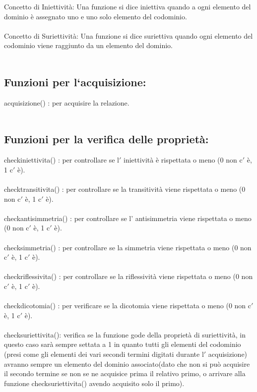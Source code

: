 \documentclass[11pt, a4paper, titlepage, block]{article}
\begin{document}
	Concetto di Iniettivit\`a: Una funzione si dice iniettiva quando a ogni elemento del dominio \`e assegnato uno e uno solo elemento del codominio.\\
	\\
	Concetto di Suriettivit\`a: Una funzione si dice suriettiva quando ogni elemento del codominio viene raggiunto da un elemento del dominio.\\
	\\
	\newpage        
	\subsection{Funzioni per l`acquisizione:}
	
	acquisizione() : per acquisire la relazione.\\
	\\
	
	\subsection{Funzioni per la verifica delle propriet\`a:}

	check\textunderscore iniettivita() : per controllare se l$'$ iniettivit\`a \`e rispettata o meno (0 non c$'$ \`e, 1 c$'$ \`e).\\
	\\
	check\textunderscore transitivita() : per controllare se la transitivit\`a 
	viene rispettata o meno (0 non c$'$ \`e, 1 c$'$ \`e).\\
	\\
	check\textunderscore antisimmetria() : per controllare se l' antisimmetria viene rispettata o meno (0 non c$'$ \`e, 1 c$'$ \`e).\\
	\\
	check\textunderscore simmetria() : per controllare se la simmetria viene rispettata o meno (0 non c$'$ \`e, 1 c$'$ \`e).\\
	\\
	check\textunderscore riflessivita() : per controllare se la riflessivit\`a viene rispettata o meno (0 non c$'$ \`e, 1 c$'$ \`e).\\
	\\
	check\textunderscore dicotomia() : per verificare se la dicotomia viene rispettata o meno (0 non c$'$ \`e, 1 c$'$ \`e).\\
	\\
	check\textunderscore suriettivita(): verifica se la funzione gode della propriet\`a di suriettivit\`a, in questo caso sar\`a sempre settata a 1 in quanto tutti gli elementi del codominio (presi come gli elementi dei vari secondi termini digitati durante l$'$ acquisizione) avranno sempre un elemento del dominio associato(dato che non si pu\`o acquisire il secondo termine se non se ne acquisice prima il relativo primo, o arrivare alla funzione check\textunderscore suriettivita() avendo acquisito solo il primo).\\
	\\
	\newpage
\end{document}
